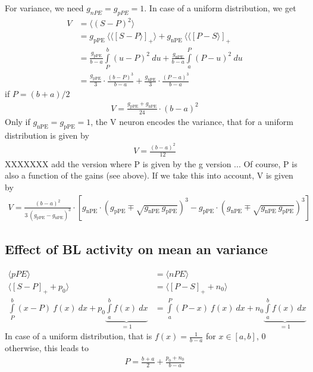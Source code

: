 \documentclass[10pt,a4paper,draft]{article}
\begin{document}
For variance, we need $g_{nPE}=g_{pPE}=1$. In case of a uniform distribution, we get
%
\begin{align*}
V &= \langle (S-P)^2\rangle \\
   &= g_\mathrm{pPE}\ \langle \langle[ S-P \rangle]_+ \rangle + g_\mathrm{nPE}\ \langle \langle[ P-S \rangle]_+ \\
   &= \frac{g_\mathrm{pPE}}{b-a} \int\limits_P^b (u-P)^2\ du + \frac{g_\mathrm{nPE}}{b-a} \int\limits_a^P (P-u)^2\ du \\
   &= \frac{g_\mathrm{pPE}}{3} \cdot \frac{(b-P)^3}{b-a} + \frac{g_\mathrm{nPE}}{3} \cdot \frac{(P-a)^3}{b-a} 
\end{align*}
%
if $P = (b+a)/2$
%
\begin{align*}
V = \frac{g_\mathrm{pPE} + g_\mathrm{nPE}}{24} \cdot (b-a)^2
\end{align*}
%
Only if $g_\mathrm{nPE}=g_\mathrm{pPE}=1$, the V neuron encodes the variance, that for a uniform distribution is given by
%
\begin{align*}
V = \frac{ (b-a)^2}{12}
\end{align*}
%
XXXXXXX add the version where P is given by the g version ...
%
Of course, P is also a function of the gains (see above). If we take this into account, V is given by
%
\begin{align*}
V = \frac{(b-a)^2}{3\ (g_\mathrm{pPE} - g_\mathrm{nPE})^3} \cdot \left[ g_\mathrm{nPE} \cdot( g_\mathrm{pPE} \mp \sqrt{g_\mathrm{nPE}\ g_\mathrm{pPE}})^3 - g_\mathrm{pPE} \cdot (g_\mathrm{nPE} \mp \sqrt{g_\mathrm{nPE}\ g_\mathrm{pPE}})^3\right]
\end{align*}



\subsection*{Effect of BL activity on mean an variance}
%
\begin{align*}
\langle pPE \rangle &= \langle nPE \rangle \\
\langle \left[ S - P\right]_+ + p_0\rangle &= \langle \left[ P - S\right]_+ + n_0\rangle \\
\int\limits_P^b (x - P)\ f(x)\ dx + p_0 \underbrace{\int\limits_a^b f(x)\ dx}_{=1}  &= \int\limits_a^P (P - x)\ f(x)\ dx + n_0 \underbrace{\int\limits_a^b f(x)\ dx}_{=1} 
\end{align*}
%
In case of a uniform distribution, that is $f(x) = \frac{1}{b-a}$ for $x\in [a,b]$, 0 otherwise, this leads to
%
\begin{align*}
P = \frac{b+a}{2} + \frac{p_0 + n_0}{b-a}
\end{align*}
%
\end{document}

